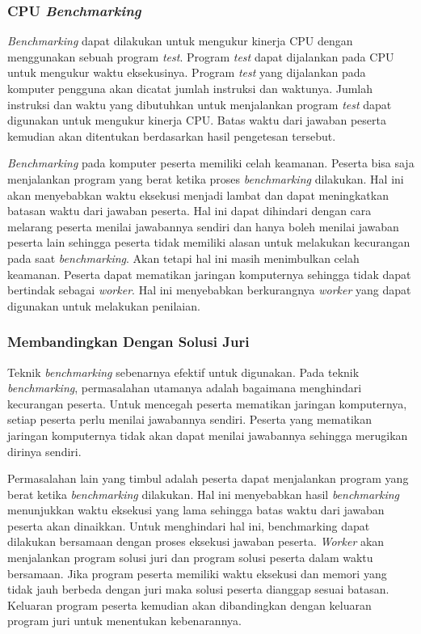 \subsubsection{CPU \textit{Benchmarking}}

\par \textit{Benchmarking} dapat dilakukan untuk mengukur kinerja CPU dengan menggunakan sebuah program \textit{test}. Program \textit{test} dapat dijalankan pada CPU untuk mengukur waktu eksekusinya. Program \textit{test} yang dijalankan pada komputer pengguna akan dicatat jumlah instruksi dan waktunya. Jumlah instruksi dan waktu yang dibutuhkan untuk menjalankan program \textit{test} dapat digunakan untuk mengukur kinerja CPU. Batas waktu dari jawaban peserta kemudian akan ditentukan berdasarkan hasil pengetesan tersebut.

\par \textit{Benchmarking} pada komputer peserta memiliki celah keamanan. Peserta bisa saja menjalankan program yang berat ketika proses \textit{benchmarking} dilakukan. Hal ini akan menyebabkan waktu eksekusi menjadi lambat dan dapat meningkatkan batasan waktu dari jawaban peserta. Hal ini dapat dihindari dengan cara melarang peserta menilai jawabannya sendiri dan hanya boleh menilai jawaban peserta lain sehingga peserta tidak memiliki alasan untuk melakukan kecurangan pada saat \textit{benchmarking}. Akan tetapi hal ini masih menimbulkan celah keamanan. Peserta dapat mematikan jaringan komputernya sehingga tidak dapat bertindak sebagai \textit{worker}. Hal ini menyebabkan berkurangnya \textit{worker} yang dapat digunakan untuk melakukan penilaian.

\subsubsection{Membandingkan Dengan Solusi Juri} \label{subsec:time-memory-measure-compare-with-jury}

\par Teknik \textit{benchmarking} sebenarnya efektif untuk digunakan. Pada teknik \textit{benchmarking}, permasalahan utamanya adalah bagaimana menghindari kecurangan peserta. Untuk mencegah peserta mematikan jaringan komputernya, setiap peserta perlu menilai jawabannya sendiri. Peserta yang mematikan jaringan komputernya tidak akan dapat menilai jawabannya sehingga merugikan dirinya sendiri.

\par Permasalahan lain yang timbul adalah peserta dapat menjalankan program yang berat ketika \textit{benchmarking} dilakukan. Hal ini menyebabkan hasil \textit{benchmarking} menunjukkan waktu eksekusi yang lama sehingga batas waktu dari jawaban peserta akan dinaikkan. Untuk menghindari hal ini, benchmarking dapat dilakukan bersamaan dengan proses eksekusi jawaban peserta. \textit{Worker} akan menjalankan program solusi juri dan program solusi peserta dalam waktu bersamaan. Jika program peserta memiliki waktu eksekusi dan memori yang tidak jauh berbeda dengan juri maka solusi peserta dianggap sesuai batasan. Keluaran program peserta kemudian akan dibandingkan dengan keluaran program juri untuk menentukan kebenarannya.

